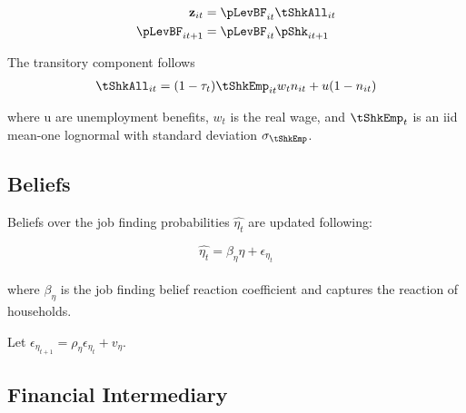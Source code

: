 \documentclass[titlepage]{\econtex}\providecommand{\texname}{Dissertation-Proposal}
\begin{document}
\begin{align*}
\mathbf{z}_{it} &= \pLevBF_{it}\tShkAll_{it} \\
\pLevBF_{it+1} &=\pLevBF_{it} \pShk_{it+1} \\
\end{align*}


The transitory component follows   \\


\begin{align*}
\tShkAll _{it}=  (1-\tau_{t})\tShkEmp_{it} w_{t} n_{it} + u ( 1 - n_{it} )
\end{align*}




where u are unemployment benefits, $w_{t}$ is the real wage, and $\tShkEmp_{t}$ is an iid mean-one lognormal with standard deviation $\sigma_{\tShkEmp}$.  



\hypertarget{Beliefs}{}
\subsection{Beliefs}

\label{subsec: Beliefs}

Beliefs over the job finding probabilities $\hat{\eta_{t}}$ are updated following:

$$\hat{\eta_{t}} =  \beta_{\eta} \eta  + \epsilon_{\eta_{t}}$$ \\


where $\beta_{\eta}$ is the job finding belief reaction coefficient and captures the reaction of households. 

Let  $\epsilon_{\eta_{t+1}} = \rho_{ \eta} \epsilon_{{\eta}_{t} }+ v_{\eta}$.

\begin{comment}
Combining the transition equations, the recursive nature of
the problem allows us to rewrite it more compactly in Bellman equation form,
\begin{eqnarray*}
\VFunc_{t}(\mLevBF_{t},\pLevBF_{t}) & = & \max_{\cLevBF_{t}}~\left\{\util(\cLevBF_{t})+\DiscFac \Ex_{t}\left[ \VFunc_{t+1}((\mLevBF_{t}-\cLevBF_{t})\Rfree+ \pLevBF_{t+1}\tShkAll_{t+1},\pLevBF_{t} \PGro  \pShk_{t+1})\right]\right\}
.
\end{eqnarray*}
\end{comment} 

\hypertarget{Financial Intermediary}{}
\subsection{Financial Intermediary}
\end{document}
